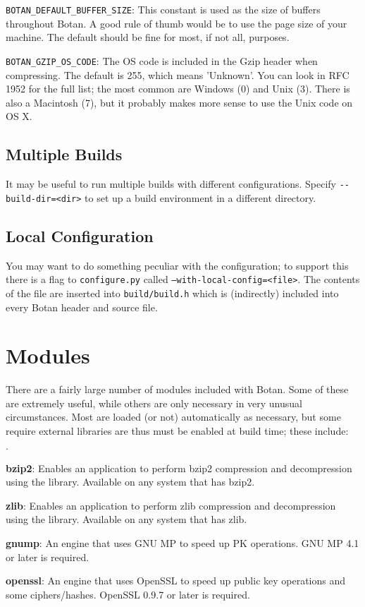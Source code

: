 \documentclass{article}
\newcommand{\filename}[1]{\texttt{#1}}
\newcommand{\macro}[1]{\texttt{#1}}
\begin{document}
\macro{BOTAN\_DEFAULT\_BUFFER\_SIZE}: This constant is used as the size of
buffers throughout Botan. A good rule of thumb would be to use the page size of
your machine. The default should be fine for most, if not all, purposes.

\macro{BOTAN\_GZIP\_OS\_CODE}: The OS code is included in the Gzip header when
compressing. The default is 255, which means 'Unknown'. You can look in RFC
1952 for the full list; the most common are Windows (0) and Unix (3). There is
also a Macintosh (7), but it probably makes more sense to use the Unix code on
OS X.

\subsection{Multiple Builds}

It may be useful to run multiple builds with different
configurations. Specify \verb|--build-dir=<dir>| to set up a build
environment in a different directory.

\subsection{Local Configuration}

You may want to do something peculiar with the configuration; to
support this there is a flag to \filename{configure.py} called
\texttt{--with-local-config=<file>}. The contents of the file are
inserted into \filename{build/build.h} which is (indirectly) included
into every Botan header and source file.

\section{Modules}

There are a fairly large number of modules included with Botan. Some
of these are extremely useful, while others are only necessary in very
unusual circumstances. Most are loaded (or not) automatically as
necessary, but some require external libraries are thus must be
enabled at build time; these include:

\newcommand{\mod}[2]{\textbf{#1}: #2}

\begin{list}{$\cdot$}
  \item \mod{bzip2}{Enables an application to perform bzip2 compression
         and decompression using the library. Available on any system that has
         bzip2.}

  \item \mod{zlib}{Enables an application to perform zlib compression and
         decompression using the library. Available on any system that has
         zlib.}

  \item \mod{gnump}{An engine that uses GNU MP to speed up PK operations.
         GNU MP 4.1 or later is required.}

  \item \mod{openssl}{An engine that uses OpenSSL to speed up public key
                      operations and some ciphers/hashes. OpenSSL 0.9.7 or
                      later is required.}
\end{list}
\end{document}
